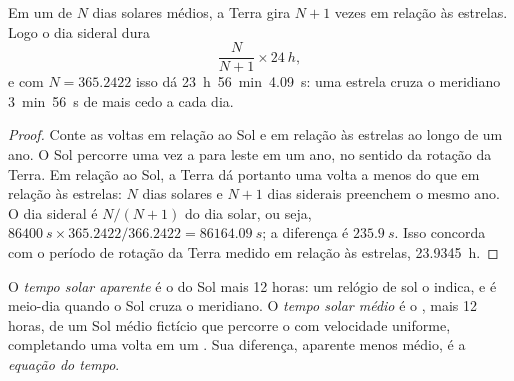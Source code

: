 \begin{proposition}\label{prop:b1:spherical-astronomy:sidereal-day}
Em um  de $N$ dias solares médios, a Terra gira $N + 1$ vezes em relação às estrelas. Logo o dia sideral dura
\[
  \frac{N}{N + 1}\times\qty{24}{h},
\]
e com $N = 365.2422$ isso dá \qty{23}{h}~\qty{56}{min}~\qty{4.09}{s}: uma estrela cruza o meridiano \qty{3}{min}~\qty{56}{s} de  mais cedo a cada dia.
\end{proposition}

\begin{proof}
Conte as voltas em relação ao Sol e em relação às estrelas ao longo de um ano. O Sol percorre uma vez a  para leste em um ano, no sentido da rotação da Terra. Em relação ao Sol, a Terra dá portanto uma volta a menos do que em relação às estrelas: $N$ dias solares e $N + 1$ dias siderais preenchem o mesmo ano. O dia sideral é $N/(N+1)$ do dia solar, ou seja, $\qty{86400}{s}\times 365.2422/366.2422 = \qty{86164.09}{s}$; a diferença é $\qty{235.9}{s}$. Isso concorda com o período de rotação da Terra medido em relação às estrelas, \qty{23.9345}{h}.
\end{proof}

\begin{definition}\label{def:b1:spherical-astronomy:solar-time}
O \emph{tempo solar aparente} é o  do Sol mais 12 horas: um relógio de sol o indica, e é meio-dia quando o Sol cruza o meridiano. O \emph{tempo solar médio} é o , mais 12 horas, de um Sol médio fictício que percorre o  com velocidade uniforme, completando uma volta em um . Sua diferença, aparente menos médio, é a \emph{equação do tempo}.
\end{definition}

